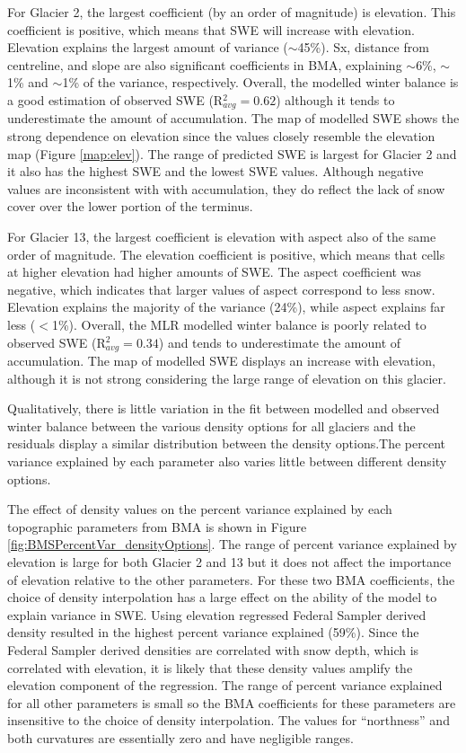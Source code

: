 \documentclass[12pt]{article}
\begin{document}
For Glacier 2, the largest coefficient (by an order of magnitude) is elevation. This coefficient is positive, which means that SWE will increase with elevation. Elevation explains the largest amount of variance ($\sim$45\%). Sx, distance from centreline, and slope are also significant coefficients in BMA, explaining $\sim$6\%, $\sim$1\% and $\sim$1\% of the variance, respectively.  Overall, the modelled winter balance is a good estimation of observed SWE (R$^2_{avg}=0.62$) although it tends to underestimate the amount of accumulation. The map of modelled SWE shows the strong dependence on elevation since the values closely resemble the elevation map (Figure \ref{map:elev}). The range of predicted SWE is largest for Glacier 2 and it also has the highest SWE and the lowest SWE values. Although negative values are inconsistent with with accumulation, they do reflect the lack of snow cover over the lower portion of the terminus. 

For Glacier 13, the largest coefficient is elevation with aspect also of the same order of magnitude. The elevation coefficient is positive, which means that cells at higher elevation had higher amounts of SWE. The aspect coefficient was negative, which indicates that larger values of aspect correspond to less snow. Elevation explains the majority of the variance (24\%), while aspect explains far less ($<$1\%).  Overall, the MLR modelled winter balance is poorly related to observed SWE (R$^2_{avg}=0.34$) and tends to underestimate the amount of accumulation. The map of modelled SWE displays an increase with elevation, although it is not strong considering the large range of elevation on this glacier.

Qualitatively, there is little variation in the fit between modelled and observed winter balance between the various density options for all glaciers and the residuals display a similar distribution between the density options.The percent variance explained by each parameter also varies little between different density options. 

The effect of density values on the percent variance explained by each topographic parameters from BMA is shown in Figure \ref{fig:BMSPercentVar_densityOptions}. The range of percent variance explained by elevation is large for both Glacier 2 and 13 but it does not affect the importance of elevation relative to the other parameters. For these two BMA coefficients, the choice of density interpolation has a large effect on the ability of the model to explain variance in SWE. Using elevation regressed Federal Sampler derived density resulted in the highest percent variance explained (59\%). Since the Federal Sampler derived densities are correlated with snow depth, which is correlated with elevation, it is likely that these density values amplify the elevation component of the regression. The range of percent variance explained for all other parameters is small so the BMA coefficients for these parameters are insensitive to the choice of density interpolation. The values for ``northness'' and both curvatures are essentially zero and have negligible ranges. 
\end{document}
